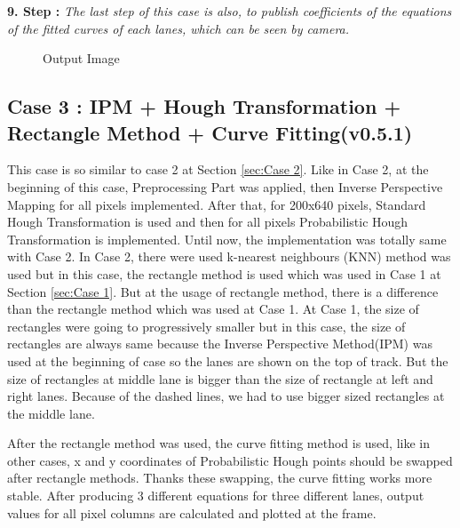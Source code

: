 \textbf{9. Step : }\emph{\color{blue}The last step of this case is also, to publish coefficients of the equations of the fitted curves of each lanes, which can be seen by camera.}


\begin{figure}[H]
  \centering
  \caption{Output Image}
\end{figure} 


\subsection{Case 3 : IPM + Hough Transformation + Rectangle Method + Curve Fitting(v0.5.1)}\label{sec:Case 3}

This case is so similar to case 2 at Section \ref{sec:Case 2}. Like in Case 2, at the beginning of this case, Preprocessing Part was applied, then Inverse Perspective Mapping for all pixels implemented. After that, for 200x640 pixels, Standard Hough Transformation is used and then for all pixels Probabilistic Hough Transformation is implemented. Until now, the implementation was totally same with Case 2. In Case 2, there were used k-nearest neighbours (KNN) method was used but in this case, the rectangle method is used which was used in Case 1 at Section \ref{sec:Case 1}. But at the usage of rectangle method, there is a difference than the rectangle method which was used at Case 1. At Case 1, the size of rectangles were going to progressively smaller but in this case, the size of rectangles are always same because the Inverse Perspective Method(IPM) was used at the beginning of case so the lanes are shown on the top of track. But the size of rectangles at middle lane is bigger than the size of rectangle at left and right lanes. Because of the dashed lines, we had to use bigger sized rectangles at the middle lane.

After the rectangle method was used,  the curve fitting method is used, like in other cases, x and y coordinates of Probabilistic Hough points should be swapped after rectangle methods. Thanks these swapping, the curve fitting works more stable. After producing 3 different equations for three different lanes, output values for all pixel columns are calculated and plotted at the frame. 

